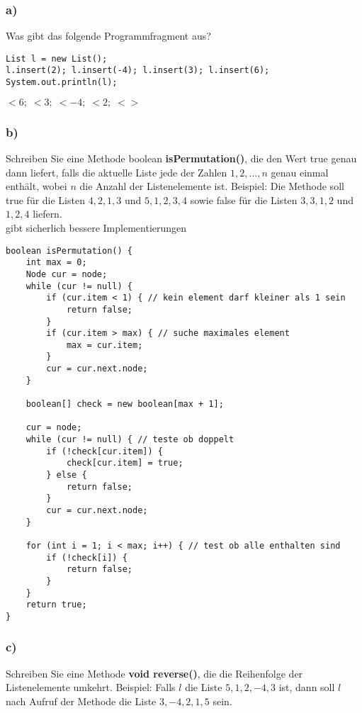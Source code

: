 \documentclass[a4paper, 10pt]{article}
\begin{document}
\subsubsection*{a)}
Was gibt das folgende Programmfragment aus?

\begin{lstlisting}
List l = new List();
l.insert(2); l.insert(-4); l.insert(3); l.insert(6);
System.out.println(l);
\end{lstlisting}

$<6;\;<3;\;<-4;\;<2;\;<>$

\subsubsection*{b)}
Schreiben Sie eine Methode boolean \textbf{isPermutation()}, die den Wert true genau
dann liefert, falls die aktuelle Liste jede der Zahlen $1, 2, \ldots, n$ genau einmal enthält,
wobei $n$ die Anzahl der Listenelemente ist. Beispiel: Die Methode soll true für die
Listen $4, 2, 1, 3$ und $5, 1, 2, 3, 4$ sowie false für die Listen $3, 3, 1, 2$ und $1, 2, 4$ liefern.\\

gibt sicherlich bessere Implementierungen

\begin{lstlisting}
boolean isPermutation() {
    int max = 0;
    Node cur = node;
    while (cur != null) { 
        if (cur.item < 1) { // kein element darf kleiner als 1 sein
            return false;
        }
        if (cur.item > max) { // suche maximales element
            max = cur.item;
        }
        cur = cur.next.node;
    }
    
    boolean[] check = new boolean[max + 1];
    
    cur = node;
    while (cur != null) { // teste ob doppelt
        if (!check[cur.item]) {
            check[cur.item] = true;
        } else {
            return false;
        }
        cur = cur.next.node;
    }
    
    for (int i = 1; i < max; i++) { // test ob alle enthalten sind
        if (!check[i]) {
            return false;
        }
    }
    return true;
}
\end{lstlisting}

\subsubsection*{c)}
Schreiben Sie eine Methode \textbf{void reverse()}, die die Reihenfolge der Listenelemente
umkehrt. Beispiel: Falls $l$ die Liste $5, 1, 2,-4, 3$ ist, dann soll $l$ nach Aufruf der
Methode die Liste $3,-4, 2, 1, 5$ sein.
\end{document}
